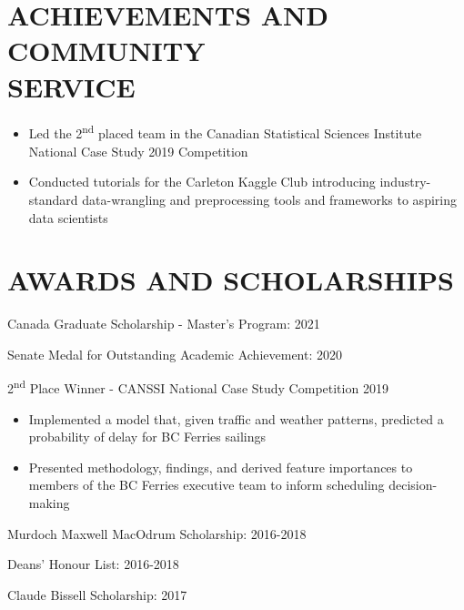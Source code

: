 \documentclass[margin]{res}
\newcommand{\ts}{\textsuperscript}
\begin{document}
\begin{resume}
      
      \section{ACHIEVEMENTS AND \\COMMUNITY \\ SERVICE }
      \begin{itemize} \itemsep -2pt
            \item{Led the 2\ts{nd} placed team in the Canadian Statistical Sciences Institute National Case Study 2019 Competition}
            \item{
                  Conducted tutorials for the Carleton Kaggle Club introducing industry-standard data-wrangling and preprocessing tools and frameworks to aspiring data scientists 
                  }
                  
      \end{itemize}
      
      
      \section{AWARDS AND SCHOLARSHIPS}
      
      \begin{itemize}
            \item{Canada Graduate Scholarship - Master's Program: 2021}
            \item{Senate Medal for Outstanding Academic Achievement: 2020}
            \item{2\ts{nd} Place Winner - CANSSI National Case Study Competition 2019 \begin{itemize}
                        \item{Implemented a model that, given traffic and weather patterns, predicted a probability of delay for BC Ferries sailings}
                        \item{Presented methodology, findings, and derived feature importances to members of the BC Ferries executive team to inform scheduling decision-making}
                  \end{itemize}
            \item{Murdoch Maxwell MacOdrum Scholarship: 2016-2018}
            \item{Deans' Honour List: 2016-2018}
            \item{Claude Bissell Scholarship: 2017}
                  }
                  

\end{itemize}
\end{resume}
\end{document}
